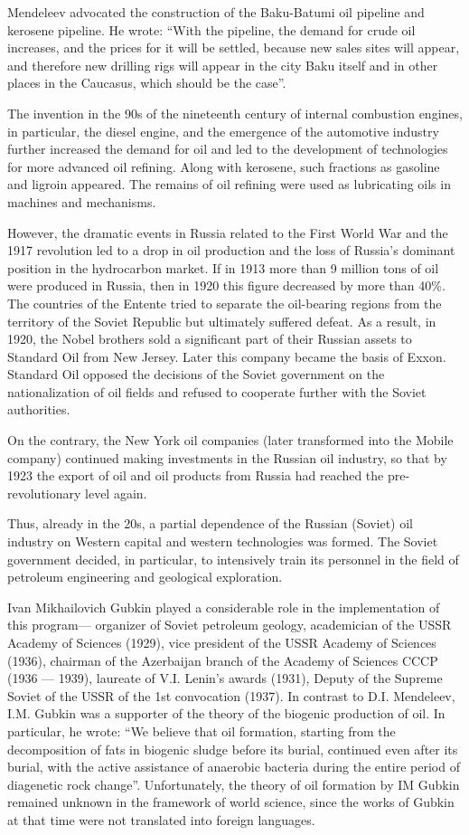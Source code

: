 \documentclass[12pt]{report}
\theoremstyle{definition}
\begin{document}
Mendeleev advocated the construction of the Baku-Batumi oil pipeline and kerosene pipeline.
He wrote: ``With the pipeline, the demand for crude oil increases, and the prices for it will be settled, because new sales sites will appear, and therefore new drilling rigs will appear in the city Baku itself and in other places in the Caucasus, which should be the case''.

The invention in the 90s of the nineteenth century of internal combustion engines, in particular, the diesel engine, and the emergence of the automotive industry further increased the demand for oil and led to the development of technologies for more advanced oil refining.
Along with kerosene, such fractions as gasoline and ligroin appeared.
The remains of oil refining were used as lubricating oils in machines and mechanisms.

However, the dramatic events in Russia related to the First World War and the 1917 revolution led to a drop in oil production and the loss of Russia's dominant position in the hydrocarbon market.
If in 1913 more than 9 million tons of oil were produced in Russia, then in 1920 this figure decreased by more than 40\%.
The countries of the Entente tried to separate the oil-bearing regions from the territory of the Soviet Republic but ultimately suffered defeat.
As a result, in 1920, the Nobel brothers sold a significant part of their Russian assets to Standard Oil from New Jersey.
Later this company became the basis of Exxon.
Standard Oil opposed the decisions of the Soviet government on the nationalization of oil fields and refused to cooperate further with the Soviet authorities.

On the contrary, the New York oil companies (later transformed into the Mobile company) continued making investments in the Russian oil industry, so that by 1923 the export of oil and oil products from Russia had reached the pre-revolutionary level again.

Thus, already in the 20s, a partial dependence of the Russian (Soviet) oil industry on Western capital and western technologies was formed.
The Soviet government decided, in particular, to intensively train its personnel in the field of petroleum engineering and geological exploration.

Ivan Mikhailovich Gubkin played a considerable role in the implementation of this program--- organizer of Soviet petroleum geology, academician of the USSR Academy of Sciences (1929), vice president of the USSR Academy of Sciences (1936), chairman of the Azerbaijan branch of the Academy of Sciences CCCP (1936 --- 1939), laureate  of V.I. Lenin's awards  (1931), Deputy of the Supreme Soviet of the USSR of the 1st convocation (1937).
In contrast to D.I. Mendeleev, I.M. Gubkin was a supporter of the theory of the biogenic production of oil.
In particular, he wrote: ``We believe that oil formation, starting from the decomposition of fats in biogenic sludge before its burial, continued even after its burial, with the active assistance of anaerobic bacteria during the entire period of diagenetic rock change''.
Unfortunately, the theory of oil formation by IM Gubkin remained unknown in the framework of world science, since the works of Gubkin at that time were not translated into foreign languages.
\end{document}

